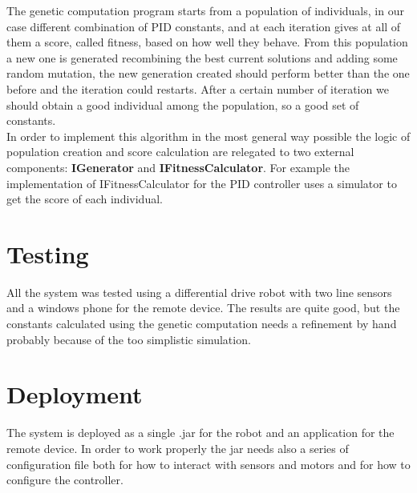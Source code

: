 \documentclass{llncs}
\newcommand{\labelsec}[1]{\label{sec:#1}}
\begin{document}
\begin{center}
\end{center}

\noindent The genetic computation program starts from a population of individuals, in our case different combination of PID constants, and at each iteration gives at all of them a score, called fitness, based on how well they behave. From this population a new one is generated recombining the best current solutions and adding some random mutation, the new generation created should perform better than the one before and the iteration could restarts. After a certain number of iteration we should obtain a good individual among the population, so a good set of constants.\\
In order to implement this algorithm in the most general way possible the logic of population creation and score calculation are relegated to two external components: \textbf{IGenerator} and \textbf{IFitnessCalculator}. For example the implementation of IFitnessCalculator for the PID controller uses a simulator to get the score of each individual.
\begin{center}
\end{center} 



\section{Testing}
\labelsec{testing}
All the system was tested using a differential drive robot with two line sensors and a windows phone for the remote device. The results are quite good, but the constants calculated using the genetic computation needs a refinement by hand probably because of the too simplistic simulation.

\section{Deployment}
\labelsec{Deployment}
The system is deployed as a single .jar for the robot and an application for the remote device. In order to work properly the jar needs also a series of configuration file both for how to interact with sensors and motors and for how to configure the controller.
\end{document}

